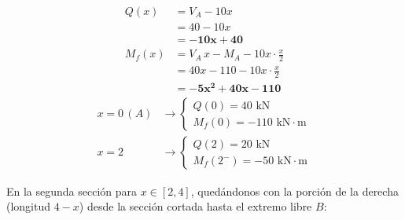 \begin{center}
\begin{minipage}{0.48\textwidth}
    \end{minipage}\hfill
    \begin{minipage}{0.48\textwidth}
        \begin{align*}
            Q(x)   & = V_A - 10x                            \\
                   & = 40 - 10x                             \\
                   & = \mathbf{-10x + 40}                   \\[6pt]
            M_f(x) & = V_A\,x - M_A - 10x \cdot \frac{x}{2} \\
                   & = 40x - 110 - 10x \cdot \frac{x}{2}    \\
                   & = \mathbf{-5x^2 + 40x - 110}
        \end{align*}
        \vspace{2pt}
        \begin{equation*}
            \begin{aligned}
                x = 0\,(A) & \to \begin{cases} Q(0) = 40\text{ kN} \\ M_f(0) = -110\text{ kN}\cdot\text{m} \end{cases}  \\[4pt]
                x = 2      & \to \begin{cases} Q(2) = 20\text{ kN} \\ M_f(2^-) = -50\text{ kN}\cdot\text{m} \end{cases}
            \end{aligned}
        \end{equation*}
    \end{minipage}
\end{center}

\vspace{1em}

En la segunda sección para $x \in [2, 4]$, quedándonos con la porción de la derecha (longitud $4-x$) desde la sección cortada hasta el extremo libre $B$:

